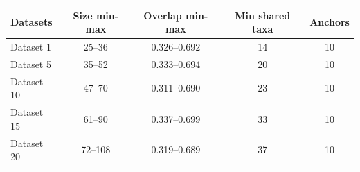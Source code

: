 \begin{tabular}{lcccc}
\hline
Datasets & Size min-max & Overlap min-max & Min shared taxa & Anchors \\
\hline
Dataset 1 & 25--36 & 0.326--0.692 & 14 & 10 \\
Dataset 5 & 35--52 & 0.333--0.694 & 20 & 10 \\
Dataset 10 & 47--70 & 0.311--0.690 & 23 & 10 \\
Dataset 15 & 61--90 & 0.337--0.699 & 33 & 10 \\
Dataset 20 & 72--108 & 0.319--0.689 & 37 & 10 \\
\hline
\end{tabular}
